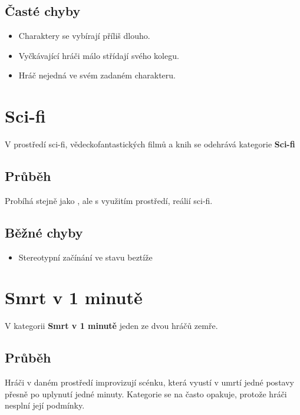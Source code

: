 \subsection{ Časté chyby } \begin{itemize}
\item Charaktery se vybírají příliš dlouho.
\item Vyčkávající hráči málo střídají svého kolegu.
\item Hráč nejedná ve svém zadaném charakteru.
\end{itemize}
 
 
 
 
 
\needspace{5cm} \section{Sci-fi} \label{sci-fi}  
V prostředí sci-fi, vědeckofantastických filmů a knih se odehrává kategorie \textbf{Sci-fi}{} 
 
\subsection{Průběh} Probíhá stejně jako , ale s využitím prostředí, reálií sci-fi.  
\subsection{Běžné chyby} \begin{itemize}
\item Stereotypní začínání ve stavu beztíže
\end{itemize}
 
 
 
 
\needspace{5cm} \section{Smrt v 1 minutě} \label{smrt v 1 minutě}  
 
 
V kategorii \textbf{Smrt v 1 minutě}{} jeden ze dvou hráčů zemře. 
 
\subsection{Průběh} Hráči v daném prostředí improvizují scénku, která vyustí v umrtí jedné postavy přesně po uplynutí jedné minuty. Kategorie se na  často opakuje, protože hráči nesplní její podmínky. 
 
